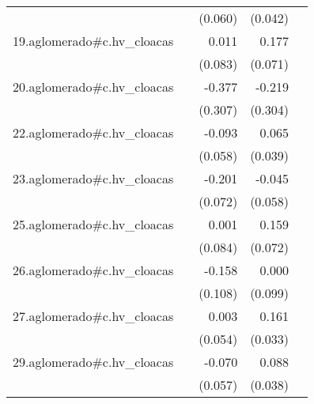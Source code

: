 {\begin{longtable}{l*{4}{D{.}{.}{-1}}}
            &                     &     (0.060)         &     (0.042)         &                     \\
\addlinespace
19.aglomerado#c.hv\_cloacas&                     &       0.011         &       0.177\sym{*}  &                     \\
            &                     &     (0.083)         &     (0.071)         &                     \\
\addlinespace
20.aglomerado#c.hv\_cloacas&                     &      -0.377         &      -0.219         &                     \\
            &                     &     (0.307)         &     (0.304)         &                     \\
\addlinespace
22.aglomerado#c.hv\_cloacas&                     &      -0.093         &       0.065         &                     \\
            &                     &     (0.058)         &     (0.039)         &                     \\
\addlinespace
23.aglomerado#c.hv\_cloacas&                     &      -0.201\sym{**} &      -0.045         &                     \\
            &                     &     (0.072)         &     (0.058)         &                     \\
\addlinespace
25.aglomerado#c.hv\_cloacas&                     &       0.001         &       0.159\sym{*}  &                     \\
            &                     &     (0.084)         &     (0.072)         &                     \\
\addlinespace
26.aglomerado#c.hv\_cloacas&                     &      -0.158         &       0.000         &                     \\
            &                     &     (0.108)         &     (0.099)         &                     \\
\addlinespace
27.aglomerado#c.hv\_cloacas&                     &       0.003         &       0.161\sym{***}&                     \\
            &                     &     (0.054)         &     (0.033)         &                     \\
\addlinespace
29.aglomerado#c.hv\_cloacas&                     &      -0.070         &       0.088\sym{*}  &                     \\
            &                     &     (0.057)         &     (0.038)         &                     \\

\end{longtable}}
